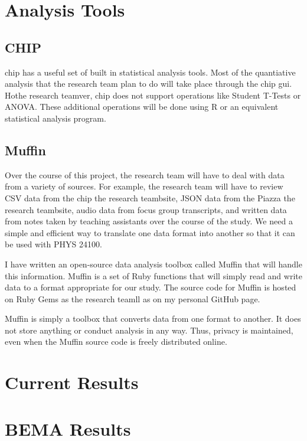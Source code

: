 \section{Analysis Tools}

\subsection{CHIP}

\gls{chip} has a useful set of built in statistical analysis tools. Most of the quantiative analysis that the research team plan to do will take place through the \gls{chip} \gls{gui}. Hothe research teamver, \gls{chip} does not support operations like Student T-Tests or ANOVA. These additional operations will be done using R or an equivalent statistical analysis program.

\subsection{Muffin}

Over the course of this project, the research team will have to deal with data from a variety of sources. For example, the research team will have to review CSV data from the \gls{chip} the research teambsite, JSON data from the Piazza the research teambsite, audio data from focus group transcripts, and written data from notes taken by teaching assistants over the course of the study. We need a simple and efficient way to translate one data format into another so that it can be used with PHYS 24100.

I have written an open-source data analysis toolbox called Muffin that will handle this information. Muffin is a set of Ruby functions that will simply read and write data to a format appropriate for our study. The source code for Muffin is hosted on Ruby Gems as the research teamll as on my personal GitHub page.

Muffin is simply a toolbox that converts data from one format to another. It does not store anything or conduct analysis in any way. Thus, privacy is maintained, even when the Muffin source code is freely distributed online.

\section{Current Results}

\section{BEMA Results}

